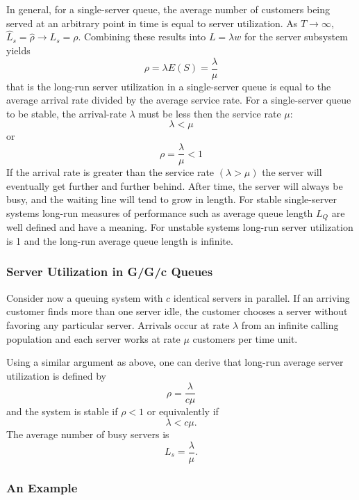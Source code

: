 \documentclass[
]{book}
\begin{document}
In general, for a single-server queue, the average number of customers being served at an arbitrary point in time is equal to server utilization. As \(T\rightarrow \infty\), \(\hat{L}_s=\hat{\rho}\rightarrow L_s=\rho\). Combining these results into \(L=\lambda w\) for the server subsystem yields
\[
\rho = \lambda E(S)=\frac{\lambda}{\mu}
\]
that is the long-run server utilization in a single-server queue is equal to the average arrival rate divided by the average service rate. For a single-server queue to be stable, the arrival-rate \(\lambda\) must be less then the service rate \(\mu\):
\[
\lambda < \mu
\]
or
\[
\rho =\frac{\lambda}{\mu} < 1
\]
If the arrival rate is greater than the service rate \((\lambda > \mu)\) the server will eventually get further and further behind. After time, the server will always be busy, and the waiting line will tend to grow in length. For stable single-server systems long-run measures of performance such as average queue length \(L_Q\) are well defined and have a meaning. For unstable systems long-run server utilization is 1 and the long-run average queue length is infinite.

\hypertarget{server-utilization-in-ggc-queues}{%
\subsubsection{Server Utilization in G/G/c Queues}\label{server-utilization-in-ggc-queues}}

Consider now a queuing system with \(c\) identical servers in parallel. If an arriving customer finds more than one server idle, the customer chooses a server without favoring any particular server. Arrivals occur at rate \(\lambda\) from an infinite calling population and each server works at rate \(\mu\) customers per time unit.

Using a similar argument as above, one can derive that long-run average server utilization is defined by
\[
\rho = \frac{\lambda}{c\mu}
\]
and the system is stable if \(\rho < 1\) or equivalently if
\[
\lambda < c\mu.
\]
The average number of busy servers is
\[
L_s=\frac{\lambda}{\mu}.
\]

\hypertarget{an-example}{%
\subsubsection{An Example}\label{an-example}}
\end{document}
